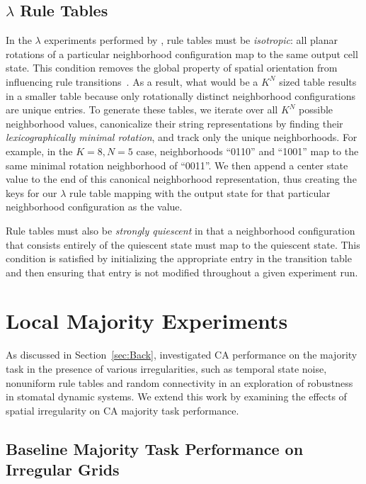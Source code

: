 \documentclass[a4paper,11pt]{article}
\begin{document}
\subsection{$\lambda$ Rule Tables}
\label{subsec:ch3_lamb}
In the $\lambda$ experiments performed by \citeauthor{wo90}, rule tables must be \textit{isotropic}: all planar rotations of a particular neighborhood configuration map to the same output cell state. This condition removes the global property of spatial orientation from influencing rule transitions~\cite{av00,wo90}. As a result, what would be a $K^N$ sized table results in a smaller table because only rotationally distinct neighborhood configurations are unique entries. To generate these tables, we iterate over all $K^N$ possible neighborhood values, canonicalize their string representations by finding their \textit{lexicographically minimal rotation}, and track only the unique neighborhoods. For example, in the $K=8, N=5$ case, neighborhoods ``0110'' and ``1001'' map to the same minimal rotation neighborhood of ``0011''. We then append a center state value to the end of this canonical neighborhood representation, thus creating the keys for our $\lambda$ rule table mapping with the output state for that particular neighborhood configuration as the value.

Rule tables must also be \textit{strongly quiescent} in that a neighborhood configuration that consists entirely of the quiescent state must map to the quiescent state. This condition is satisfied by initializing the appropriate entry in the transition table and then ensuring that entry is not modified throughout a given experiment run.


\section{Local Majority Experiments}
\label{sec:local_maj}

As discussed in Section~\ref{sec:Back}, \citeauthor{me07} investigated CA performance on the majority task in the presence of various irregularities, such as temporal state noise, nonuniform rule tables and random connectivity in an exploration of robustness in stomatal dynamic systems. We extend this work by examining the effects of spatial irregularity on CA majority task performance.

\subsection{Baseline Majority Task Performance on Irregular Grids}
\end{document}
